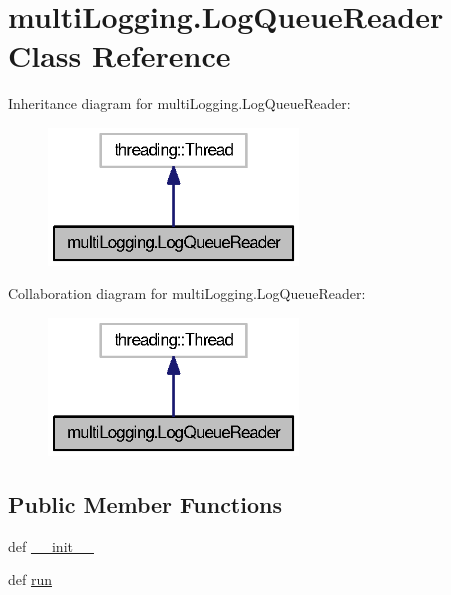 \section{multi\-Logging.\-Log\-Queue\-Reader Class Reference}
\label{classmultiLogging_1_1LogQueueReader}


Inheritance diagram for multi\-Logging.\-Log\-Queue\-Reader\-:
\nopagebreak
\begin{figure}[H]
\begin{center}
\leavevmode
\includegraphics[width=188pt]{classmultiLogging_1_1LogQueueReader__inherit__graph}
\end{center}
\end{figure}


Collaboration diagram for multi\-Logging.\-Log\-Queue\-Reader\-:
\nopagebreak
\begin{figure}[H]
\begin{center}
\leavevmode
\includegraphics[width=188pt]{classmultiLogging_1_1LogQueueReader__coll__graph}
\end{center}
\end{figure}
\subsection*{Public Member Functions}
\begin{DoxyCompactItemize}
\item 
def \hyperlink{classmultiLogging_1_1LogQueueReader_a1348a14678eda373e51ffe27d4220007}{\-\_\-\-\_\-init\-\_\-\-\_\-}
\item 
def \hyperlink{classmultiLogging_1_1LogQueueReader_a9a47fabf9c3bf350d56a11f966f7dfb8}{run}
\end{DoxyCompactItemize}
